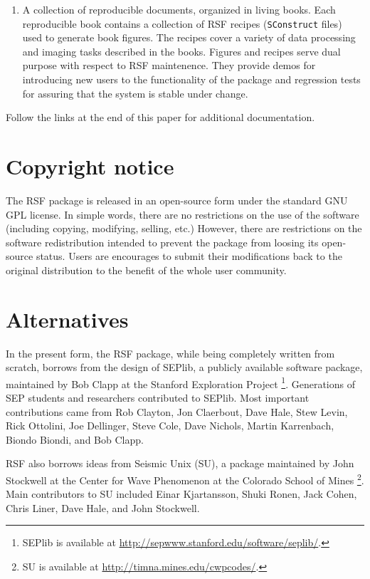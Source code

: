 \begin{enumerate}
\item A collection of reproducible documents, organized in living books. Each
  reproducible book contains a collection of RSF recipes (\texttt{SConstruct}
  files) used to generate book figures. The recipes cover a variety of data
  processing and imaging tasks described in the books. Figures and recipes
  serve dual purpose with respect to RSF maintenence. They provide demos for
  introducing new users to the functionality of the package and regression
  tests for assuring that the system is stable under change.

\end{enumerate}

Follow the links at the end of this paper for additional documentation.

\section{Copyright notice}

The RSF package is released in an open-source form under the standard GNU GPL
license. In simple words, there are no restrictions on the use of the software
(including copying, modifying, selling, etc.) However, there are restrictions
on the software redistribution intended to prevent the package from loosing
its open-source status. Users are encourages to submit their modifications
back to the original distribution to the benefit of the whole user community.

\section{Alternatives} 

In the present form, the RSF package, while being completely written from
scratch, borrows from the design of SEPlib, a publicly available software
package, maintained by Bob Clapp at the Stanford Exploration Project
\cite[]{Claerbout.sep.70.413,Dellinger.sep.73.461,Nichols.sep.82.257,Biondi.sep.92.343,Clapp.sep.102.bob1}\footnote{SEPlib
  is available at \url{http://sepwww.stanford.edu/software/seplib/}.}.
Generations of SEP students and researchers contributed to SEPlib. Most
important contributions came from Rob Clayton, Jon Claerbout, Dave Hale, Stew
Levin, Rick Ottolini, Joe Dellinger, Steve Cole, Dave Nichols, Martin
Karrenbach, Biondo Biondi, and Bob Clapp.

RSF also borrows ideas from Seismic Unix (SU), a package maintained by John
Stockwell at the Center for Wave Phenomenon at the Colorado School of Mines
\cite[]{TLE16-07-10451049,su}\footnote{SU is available at
  \url{http://timna.mines.edu/cwpcodes/}.}. Main contributors to SU
included Einar Kjartansson, Shuki Ronen, Jack Cohen, Chris Liner, Dave Hale,
and John Stockwell.

